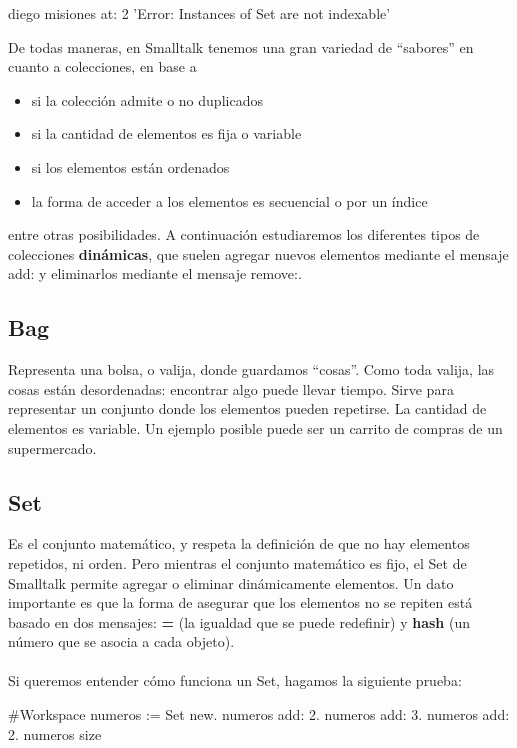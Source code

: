 \documentclass[a4paper,12pt]{book}
\begin{document}
\begin{code}
diego misiones at: 2
  'Error: Instances of Set are not indexable'
\end{code}

De todas maneras, en Smalltalk tenemos una gran variedad de ``sabores'' en cuanto a colecciones, en base a

\begin{itemize}
 \item si la colección admite o no duplicados
 \item si la cantidad de elementos es fija o variable
 \item si los elementos están ordenados
 \item la forma de acceder a los elementos es secuencial o por un índice
\end{itemize}

entre otras posibilidades. A continuación estudiaremos los diferentes tipos de colecciones \textbf{dinámicas}, que
suelen agregar nuevos elementos mediante el mensaje add: y eliminarlos mediante el mensaje remove:.

\subsection{Bag}

Representa una bolsa, o valija, donde guardamos ``cosas''. Como toda valija, las cosas están desordenadas: 
encontrar algo puede llevar tiempo. Sirve para representar un conjunto donde los elementos pueden 
repetirse. La cantidad de elementos es variable. Un ejemplo posible puede ser un carrito de compras 
de un supermercado. 

\subsection{Set}

Es el conjunto matemático, y respeta la definición de que no hay elementos repetidos, ni orden. Pero mientras
el conjunto matemático es fijo, el Set de Smalltalk permite agregar o eliminar dinámicamente elementos. 
Un dato importante es que la forma de asegurar que los elementos no se repiten está basado en dos mensajes:
\textbf{=} (la igualdad que se puede redefinir) y \textbf{hash} (un número que se asocia a cada objeto).
\\
\\
Si queremos entender cómo funciona un Set, hagamos la siguiente prueba:

\begin{code}
#Workspace
numeros := Set new.
numeros add: 2.
numeros add: 3.
numeros add: 2.
numeros size
\end{code}
\end{document}
